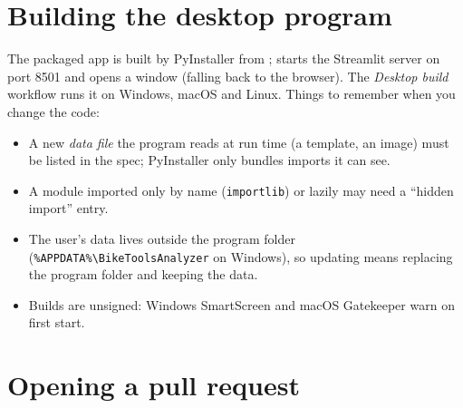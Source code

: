 \section{Building the desktop program}

The packaged app is built by PyInstaller from ;  starts the
Streamlit server on port 8501 and opens a window (falling back to the browser). The \emph{Desktop build} workflow
runs it on Windows, macOS and Linux. Things to remember when you change the code:

\begin{itemize}
\item A new \emph{data file} the program reads at run time (a template, an image) must be listed in the spec;
  PyInstaller only bundles imports it can see.
\item A module imported only by name (\texttt{importlib}) or lazily may need a ``hidden import'' entry.
\item The user's data lives outside the program folder (\texttt{\%APPDATA\%\textbackslash BikeToolsAnalyzer} on Windows),
  so updating means replacing the program folder and keeping the data.
\item Builds are unsigned: Windows SmartScreen and macOS Gatekeeper warn on first start.
\end{itemize}

\section{Opening a pull request}

